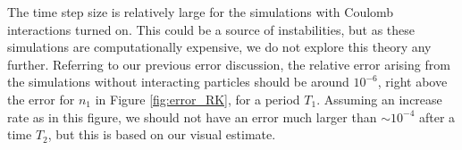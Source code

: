 The time step size is relatively large for the simulations with Coulomb interactions turned on. This could be a source of instabilities, but as these simulations are computationally expensive, we do not explore this theory any further. Referring to our previous error discussion, the relative error arising from the simulations without interacting particles should be around $10^{-6}$, right above the error for $n_1$ in Figure \ref{fig:error_RK}, for a period $T_1$. Assuming an increase rate as in this figure, we should not have an error much larger than $\sim 10^{-4}$ after a time $T_2$, but this is based on our visual estimate. 


